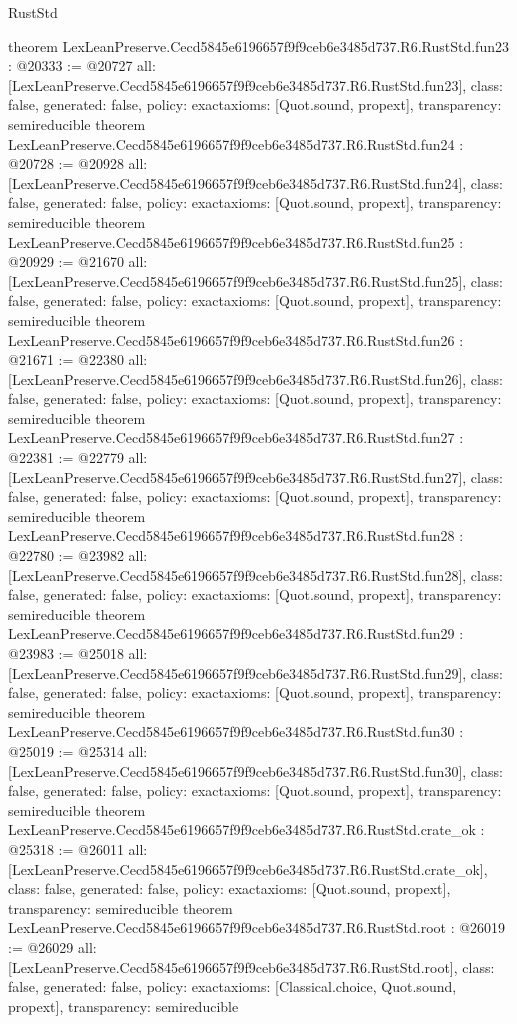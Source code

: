 \begin{lexlean}{RustStd}
\begin{coremodule}
{}
theorem LexLeanPreserve.Cecd5845e6196657f9f9ceb6e3485d737.R6.RustStd.fun23 : @20333 := @20727 {
  all: [LexLeanPreserve.Cecd5845e6196657f9f9ceb6e3485d737.R6.RustStd.fun23],
  class: false,
  generated: false,
  policy: exact{axioms: [Quot.sound, propext]},
  transparency: semireducible
}
theorem LexLeanPreserve.Cecd5845e6196657f9f9ceb6e3485d737.R6.RustStd.fun24 : @20728 := @20928 {
  all: [LexLeanPreserve.Cecd5845e6196657f9f9ceb6e3485d737.R6.RustStd.fun24],
  class: false,
  generated: false,
  policy: exact{axioms: [Quot.sound, propext]},
  transparency: semireducible
}
theorem LexLeanPreserve.Cecd5845e6196657f9f9ceb6e3485d737.R6.RustStd.fun25 : @20929 := @21670 {
  all: [LexLeanPreserve.Cecd5845e6196657f9f9ceb6e3485d737.R6.RustStd.fun25],
  class: false,
  generated: false,
  policy: exact{axioms: [Quot.sound, propext]},
  transparency: semireducible
}
theorem LexLeanPreserve.Cecd5845e6196657f9f9ceb6e3485d737.R6.RustStd.fun26 : @21671 := @22380 {
  all: [LexLeanPreserve.Cecd5845e6196657f9f9ceb6e3485d737.R6.RustStd.fun26],
  class: false,
  generated: false,
  policy: exact{axioms: [Quot.sound, propext]},
  transparency: semireducible
}
theorem LexLeanPreserve.Cecd5845e6196657f9f9ceb6e3485d737.R6.RustStd.fun27 : @22381 := @22779 {
  all: [LexLeanPreserve.Cecd5845e6196657f9f9ceb6e3485d737.R6.RustStd.fun27],
  class: false,
  generated: false,
  policy: exact{axioms: [Quot.sound, propext]},
  transparency: semireducible
}
theorem LexLeanPreserve.Cecd5845e6196657f9f9ceb6e3485d737.R6.RustStd.fun28 : @22780 := @23982 {
  all: [LexLeanPreserve.Cecd5845e6196657f9f9ceb6e3485d737.R6.RustStd.fun28],
  class: false,
  generated: false,
  policy: exact{axioms: [Quot.sound, propext]},
  transparency: semireducible
}
theorem LexLeanPreserve.Cecd5845e6196657f9f9ceb6e3485d737.R6.RustStd.fun29 : @23983 := @25018 {
  all: [LexLeanPreserve.Cecd5845e6196657f9f9ceb6e3485d737.R6.RustStd.fun29],
  class: false,
  generated: false,
  policy: exact{axioms: [Quot.sound, propext]},
  transparency: semireducible
}
theorem LexLeanPreserve.Cecd5845e6196657f9f9ceb6e3485d737.R6.RustStd.fun30 : @25019 := @25314 {
  all: [LexLeanPreserve.Cecd5845e6196657f9f9ceb6e3485d737.R6.RustStd.fun30],
  class: false,
  generated: false,
  policy: exact{axioms: [Quot.sound, propext]},
  transparency: semireducible
}
theorem LexLeanPreserve.Cecd5845e6196657f9f9ceb6e3485d737.R6.RustStd.crate_ok : @25318 := @26011 {
  all: [LexLeanPreserve.Cecd5845e6196657f9f9ceb6e3485d737.R6.RustStd.crate_ok],
  class: false,
  generated: false,
  policy: exact{axioms: [Quot.sound, propext]},
  transparency: semireducible
}
theorem LexLeanPreserve.Cecd5845e6196657f9f9ceb6e3485d737.R6.RustStd.root : @26019 := @26029 {
  all: [LexLeanPreserve.Cecd5845e6196657f9f9ceb6e3485d737.R6.RustStd.root],
  class: false,
  generated: false,
  policy: exact{axioms: [Classical.choice, Quot.sound, propext]},
  transparency: semireducible
}


\end{coremodule}
\end{lexlean}
